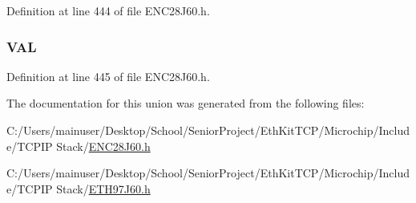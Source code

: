 Definition at line 444 of file E\+N\+C28\+J60.\+h.

\hypertarget{union_p_h_y_r_e_g_abe45eb6b11b30b993f8029a7048239a2}{}
\subsubsection[{V\+A\+L}]{ V\+A\+L}\label{union_p_h_y_r_e_g_abe45eb6b11b30b993f8029a7048239a2}


Definition at line 445 of file E\+N\+C28\+J60.\+h.



The documentation for this union was generated from the following files\+:\begin{DoxyCompactItemize}
\item 
C\+:/\+Users/mainuser/\+Desktop/\+School/\+Senior\+Project/\+Eth\+Kit\+T\+C\+P/\+Microchip/\+Include/\+T\+C\+P\+I\+P Stack/\hyperlink{_e_n_c28_j60_8h}{E\+N\+C28\+J60.\+h}\item 
C\+:/\+Users/mainuser/\+Desktop/\+School/\+Senior\+Project/\+Eth\+Kit\+T\+C\+P/\+Microchip/\+Include/\+T\+C\+P\+I\+P Stack/\hyperlink{_e_t_h97_j60_8h}{E\+T\+H97\+J60.\+h}\end{DoxyCompactItemize}
